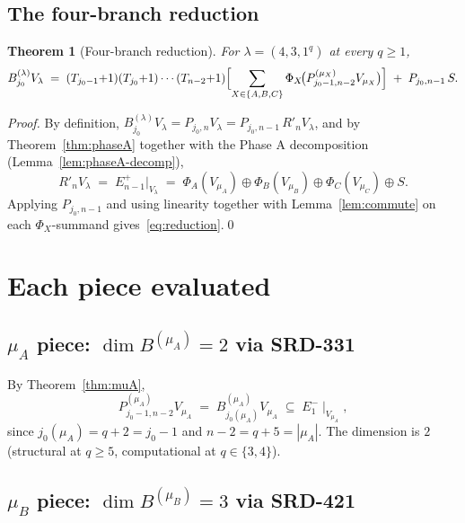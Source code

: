 \documentclass[11pt]{article}
\newtheorem{theorem}{Theorem}
\theoremstyle{definition}
\begin{document}
\subsection{The four-branch reduction}

\begin{theorem}[Four-branch reduction]\label{thm:reduction}
For $\lambda = (4, 3, 1^q)$ at every $q \ge 1$,
\begin{equation}\label{eq:reduction}
   B^{(\lambda)}_{j_0} V_\lambda
   \;=\;
   (T_{j_0-1}{+}1)(T_{j_0}{+}1)\cdots(T_{n-2}{+}1)
   \Bigl[
   \sum_{X \in \{A, B, C\}} \Phi_X\!\big(P^{(\mu_X)}_{j_0-1, n-2} V_{\mu_X}\big)
   \Bigr]
   \;+\; P_{j_0, n-1}\, S.
\end{equation}
\end{theorem}

\begin{proof}
By definition,
$B^{(\lambda)}_{j_0} V_\lambda = P_{j_0, n} V_\lambda
= P_{j_0, n-1}\, R'_n V_\lambda$, and by
Theorem~\ref{thm:phaseA} together with the Phase A decomposition
(Lemma~\ref{lem:phaseA-decomp}),
\[
   R'_n V_\lambda \;=\; E_{n-1}^+|_{V_\lambda}
   \;=\; \Phi_A(V_{\mu_A}) \oplus \Phi_B(V_{\mu_B}) \oplus \Phi_C(V_{\mu_C}) \oplus S.
\]
Applying $P_{j_0, n-1}$ and using linearity together with
Lemma~\ref{lem:commute} on each $\Phi_X$-summand
gives~\eqref{eq:reduction}.\qed
\end{proof}

\section{Each piece evaluated}\label{sec:pieces}

\subsection{$\mu_A$ piece: $\dim B^{(\mu_A)} = 2$ via SRD-331}

By Theorem~\ref{thm:muA},
\[
   P^{(\mu_A)}_{j_0 - 1, n - 2} V_{\mu_A}
   \;=\; B^{(\mu_A)}_{j_0(\mu_A)} V_{\mu_A}
   \;\subseteq\; E_1^-\!\mid_{V_{\mu_A}},
\]
since $j_0(\mu_A) = q + 2 = j_0 - 1$ and $n - 2 = q + 5 = |\mu_A|$.
The dimension is $2$ (structural at $q \ge 5$, computational at
$q \in \{3, 4\}$).

\subsection{$\mu_B$ piece: $\dim B^{(\mu_B)} = 3$ via SRD-421}
\end{document}
